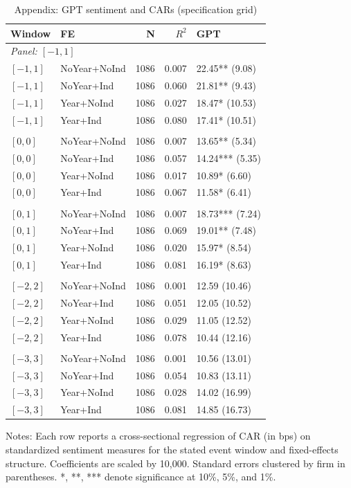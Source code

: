 \begin{table}[p]
\centering
\caption{Appendix: GPT sentiment and CARs (specification grid)}
\label{tab:app_gpt_only}
\scriptsize
\setlength{\tabcolsep}{4pt}
\renewcommand{\arraystretch}{1.1}
\begin{tabular}{l l r r l}
\toprule
Window & FE & N & $R^{2}$ & GPT \\
\midrule
\multicolumn{5}{l}{\textit{Panel: $[-1,1]$}} \\
\addlinespace[1pt]
$[-1,1]$ & NoYear+NoInd & 1086 & 0.007 & 22.45** (9.08) \\
$[-1,1]$ & NoYear+Ind & 1086 & 0.060 & 21.81** (9.43) \\
$[-1,1]$ & Year+NoInd & 1086 & 0.027 & 18.47* (10.53) \\
$[-1,1]$ & Year+Ind & 1086 & 0.080 & 17.41* (10.51) \\
\addlinespace[2pt]
\multicolumn{5}{l}{\textit{Panel: $[0,0]$}} \\
\addlinespace[1pt]
$[0,0]$ & NoYear+NoInd & 1086 & 0.007 & 13.65** (5.34) \\
$[0,0]$ & NoYear+Ind & 1086 & 0.057 & 14.24*** (5.35) \\
$[0,0]$ & Year+NoInd & 1086 & 0.017 & 10.89* (6.60) \\
$[0,0]$ & Year+Ind & 1086 & 0.067 & 11.58* (6.41) \\
\addlinespace[2pt]
\multicolumn{5}{l}{\textit{Panel: $[0,1]$}} \\
\addlinespace[1pt]
$[0,1]$ & NoYear+NoInd & 1086 & 0.007 & 18.73*** (7.24) \\
$[0,1]$ & NoYear+Ind & 1086 & 0.069 & 19.01** (7.48) \\
$[0,1]$ & Year+NoInd & 1086 & 0.020 & 15.97* (8.54) \\
$[0,1]$ & Year+Ind & 1086 & 0.081 & 16.19* (8.63) \\
\addlinespace[2pt]
\multicolumn{5}{l}{\textit{Panel: $[-2,2]$}} \\
\addlinespace[1pt]
$[-2,2]$ & NoYear+NoInd & 1086 & 0.001 & 12.59 (10.46) \\
$[-2,2]$ & NoYear+Ind & 1086 & 0.051 & 12.05 (10.52) \\
$[-2,2]$ & Year+NoInd & 1086 & 0.029 & 11.05 (12.52) \\
$[-2,2]$ & Year+Ind & 1086 & 0.078 & 10.44 (12.16) \\
\addlinespace[2pt]
\multicolumn{5}{l}{\textit{Panel: $[-3,3]$}} \\
\addlinespace[1pt]
$[-3,3]$ & NoYear+NoInd & 1086 & 0.001 & 10.56 (13.01) \\
$[-3,3]$ & NoYear+Ind & 1086 & 0.054 & 10.83 (13.11) \\
$[-3,3]$ & Year+NoInd & 1086 & 0.028 & 14.02 (16.99) \\
$[-3,3]$ & Year+Ind & 1086 & 0.081 & 14.85 (16.73) \\
\bottomrule
\end{tabular}
\parbox{0.95\linewidth}{\footnotesize Notes: Each row reports a cross-sectional regression of CAR (in bps) on standardized sentiment measures for the stated event window and fixed-effects structure. Coefficients are scaled by 10,000. Standard errors clustered by firm in parentheses. *, **, *** denote significance at 10\%, 5\%, and 1\%.}
\end{table}

